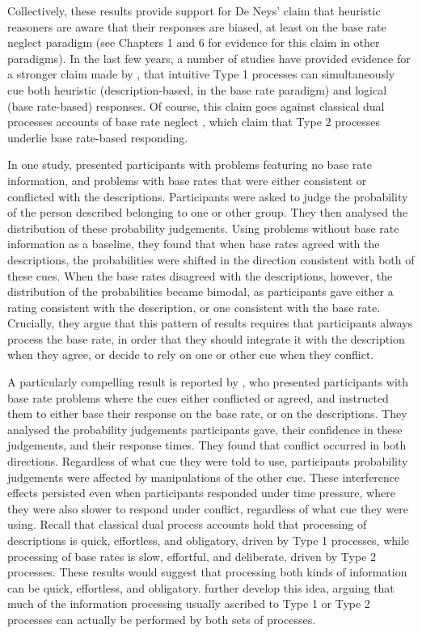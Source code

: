 Collectively, these results provide support for 
De Neys' \citep[i.e.][]{DeNeys2008,DeNeys2008a} claim
that heuristic reasoners are aware that their responses are biased,
at least on the base rate neglect paradigm
(see Chapters 1 and 6 for evidence for this claim in other paradigms).
In the last few years, a number of studies
have provided evidence for a stronger claim made by \citet{DeNeys2012,DeNeys2014a},
that intuitive Type 1 processes can simultaneously cue both
heuristic (description-based, in the base rate paradigm)
and logical (base rate-based) responses.
Of course, this claim goes against classical dual processes accounts
of base rate neglect \citep{Barbey2007,Kahneman2005},
which claim that Type 2 processes underlie base rate-based responding.

In one study,
\citet{Pennycook2012b} presented participants with
problems featuring no base rate information,
and problems with base rates that were either consistent or conflicted with the descriptions.
Participants were  asked to judge the probability
of the person described belonging to one or other group.
They then analysed the distribution of these probability judgements.
Using problems without base rate information as a baseline,
they found that when base rates agreed with the descriptions,
the probabilities were shifted in the direction
consistent with both of these cues.
When the base rates disagreed with the descriptions, however,
the distribution of the probabilities became bimodal,
as participants gave either a rating consistent with the description,
or one consistent with the base rate.
Crucially, they argue that this pattern of results
requires that participants always process the base rate,
in order that they should integrate it with the description when they agree,
or decide to rely on one or other cue when they conflict.

A particularly compelling result is reported by \cite{Pennycook2014},
who presented participants with base rate problems
where the cues either conflicted or agreed,
and instructed them to either base their response
on the base rate, or on the descriptions.
They analysed the probability judgements participants gave,
their confidence in these judgements, and their response times.
They found that conflict occurred in both directions.
Regardless of what cue they were told to use,
participants probability judgements were
affected by manipulations of the other cue.
These interference effects persisted
even when participants responded under time pressure,
where they were also slower to respond under conflict,
regardless of what cue they were using.
Recall that classical dual process accounts \citep{Barbey2007,Evans2006}
hold that processing of descriptions
is quick, effortless, and obligatory, driven by Type 1 processes,
while processing of base rates
is slow, effortful, and deliberate, driven by Type 2 processes.
These results would suggest that processing both kinds of information
can be quick, effortless, and obligatory.
\citet{Handley2015} further develop this idea,
arguing that much of the information processing
usually ascribed to Type 1 or Type 2 processes
can actually be performed by both sets of processes.


